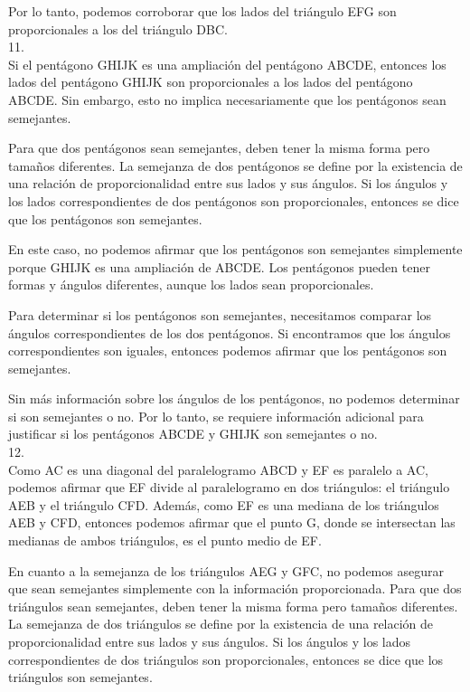 \documentclass{article}
\begin{document}
Por lo tanto, podemos corroborar que los lados del triángulo EFG son proporcionales a los del triángulo DBC.
\\
{\Large 11.}
\\
Si el pentágono GHIJK es una ampliación del pentágono ABCDE, entonces los lados del pentágono GHIJK son proporcionales a los lados del pentágono ABCDE. Sin embargo, esto no implica necesariamente que los pentágonos sean semejantes.

Para que dos pentágonos sean semejantes, deben tener la misma forma pero tamaños diferentes. La semejanza de dos pentágonos se define por la existencia de una relación de proporcionalidad entre sus lados y sus ángulos. Si los ángulos y los lados correspondientes de dos pentágonos son proporcionales, entonces se dice que los pentágonos son semejantes.

En este caso, no podemos afirmar que los pentágonos son semejantes simplemente porque GHIJK es una ampliación de ABCDE. Los pentágonos pueden tener formas y ángulos diferentes, aunque los lados sean proporcionales.

Para determinar si los pentágonos son semejantes, necesitamos comparar los ángulos correspondientes de los dos pentágonos. Si encontramos que los ángulos correspondientes son iguales, entonces podemos afirmar que los pentágonos son semejantes.

Sin más información sobre los ángulos de los pentágonos, no podemos determinar si son semejantes o no. Por lo tanto, se requiere información adicional para justificar si los pentágonos ABCDE y GHIJK son semejantes o no.
\\
{\Large 12.}
\\
Como AC es una diagonal del paralelogramo ABCD y EF es paralelo a AC, podemos afirmar que EF divide al paralelogramo en dos triángulos: el triángulo AEB y el triángulo CFD. Además, como EF es una mediana de los triángulos AEB y CFD, entonces podemos afirmar que el punto G, donde se intersectan las medianas de ambos triángulos, es el punto medio de EF.

En cuanto a la semejanza de los triángulos AEG y GFC, no podemos asegurar que sean semejantes simplemente con la información proporcionada. Para que dos triángulos sean semejantes, deben tener la misma forma pero tamaños diferentes. La semejanza de dos triángulos se define por la existencia de una relación de proporcionalidad entre sus lados y sus ángulos. Si los ángulos y los lados correspondientes de dos triángulos son proporcionales, entonces se dice que los triángulos son semejantes.
\end{document}
